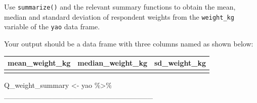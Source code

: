 \documentclass[
  letterpaper,
  DIV=11,
  numbers=noendperiod]{scrreprt}
\newenvironment{Shaded}{\begin{snugshade}}{\end{snugshade}}
\newcommand{\NormalTok}[1]{\textcolor[rgb]{0.00,0.23,0.31}{#1}}
\newcommand{\OtherTok}[1]{\textcolor[rgb]{0.00,0.23,0.31}{#1}}
\newcommand{\SpecialCharTok}[1]{\textcolor[rgb]{0.37,0.37,0.37}{#1}}
\begin{document}
\begin{tcolorbox}[enhanced jigsaw, titlerule=0mm, colback=white, left=2mm, breakable, opacitybacktitle=0.6, colbacktitle=quarto-callout-tip-color!10!white, colframe=quarto-callout-tip-color-frame, bottomtitle=1mm, opacityback=0, coltitle=black, arc=.35mm, toptitle=1mm, title=\textcolor{quarto-callout-tip-color}{\faLightbulb}\hspace{0.5em}{Practice}, leftrule=.75mm, toprule=.15mm, bottomrule=.15mm, rightrule=.15mm]

Use \texttt{summarize()} and the relevant summary functions to obtain
the mean, median and standard deviation of respondent weights from the
\texttt{weight\_kg} variable of the \texttt{yao} data frame.

Your output should be a data frame with three columns named as shown
below:

\begin{longtable}[]{@{}lll@{}}
\toprule\noalign{}
mean\_weight\_kg & median\_weight\_kg & sd\_weight\_kg \\
\midrule\noalign{}
\endhead
\bottomrule\noalign{}
\endlastfoot
& & \\
\end{longtable}

\begin{Shaded}
\begin{Highlighting}[]
\NormalTok{Q\_weight\_summary }\OtherTok{\textless{}{-}} 
\NormalTok{  yao }\SpecialCharTok{\%\textgreater{}\%}
\NormalTok{  \_\_\_\_\_\_\_\_\_\_\_\_\_\_\_\_\_\_\_\_\_\_\_\_\_\_\_\_}
\end{Highlighting}
\end{Shaded}

\end{tcolorbox}
\end{document}
